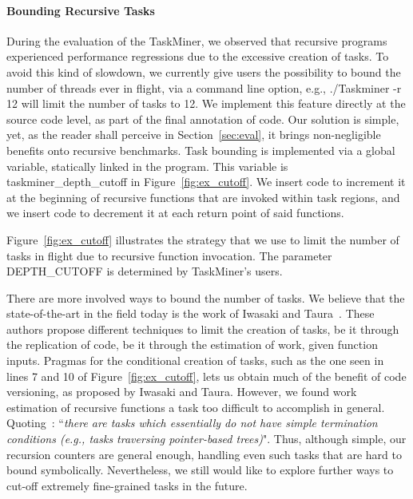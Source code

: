 \documentclass[sigplan,10pt,review,anonymous]{acmart}
\newcommand\Taskminer{\mbox{\textsf{TaskMiner}}}
\begin{document}
\paragraph{Bounding Recursive Tasks}
During the evaluation of the \Taskminer, we observed that recursive
programs experienced performance regressions due to the excessive creation
of tasks.
To avoid this kind of slowdown, we currently give users the possibility to
bound the number of threads ever in flight, via a command line option, e.g.,
\textsf{./Taskminer -r 12} will limit the number of tasks to 12.
We implement this feature directly at the source code level, as part of the
final annotation of code.
Our solution is simple, yet, as the reader shall perceive in
Section~\ref{sec:eval}, it brings non-negligible benefits onto recursive
benchmarks.
Task bounding is implemented via a global variable, statically linked in the
program.
This variable is \textsf{taskminer\_depth\_cutoff} in Figure~\ref{fig:ex_cutoff}.
We insert code to increment it at the beginning of recursive functions that
are invoked within task regions, and we insert code to decrement it at each
return point of said functions.

\begin{example}
Figure~\ref{fig:ex_cutoff} illustrates the strategy that we
use to limit the number of tasks in flight due to recursive function
invocation.
The parameter \textsf{DEPTH\_CUTOFF} is determined by \Taskminer's users.
\end{example}

There are more involved ways to bound the number of tasks.
We believe that the state-of-the-art in the field today is the work of
Iwasaki and Taura~\cite{Iwasaki16,Iwasaki16B}.
These authors propose different techniques to limit the creation of tasks,
be it through the replication of code, be it through the estimation of work,
given function inputs.
Pragmas for the conditional creation of tasks, such as the one seen in
lines 7 and 10 of Figure~\ref{fig:ex_cutoff}, lets us obtain much of the benefit
of code versioning, as proposed by Iwasaki and Taura.
However, we found work estimation of recursive functions a task too difficult
to accomplish in general.
Quoting~\cite[p.355]{Iwasaki16}: ``{\em there are tasks which essentially do not
have simple termination conditions (e.g., tasks traversing pointer-based
trees)}".
Thus, although simple, our recursion counters are general enough, handling even
such tasks that are hard to bound symbolically.
Nevertheless, we still would like to explore further ways to cut-off extremely
fine-grained tasks in the future.
\end{document}
